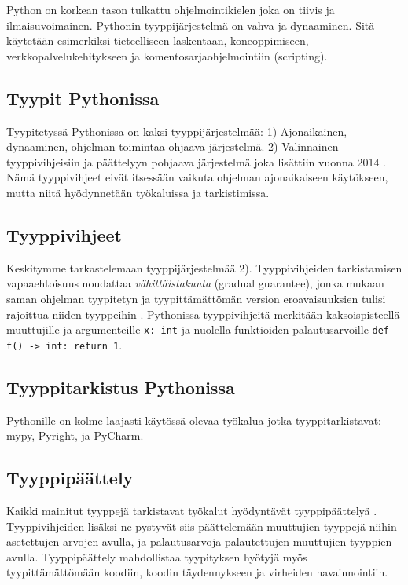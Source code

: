 \begin{otherlanguage}{finnish}
Python on korkean tason tulkattu ohjelmointikielen joka on tiivis ja ilmaisuvoimainen. Pythonin tyyppijärjestelmä on vahva ja dynaaminen. Sitä käytetään esimerkiksi tieteelliseen laskentaan, koneoppimiseen, verkkopalvelukehitykseen ja komentosarjaohjelmointiin (scripting).

\subsection*{Tyypit Pythonissa}

Tyypitetyssä Pythonissa on kaksi tyyppijärjestelmää: 1) Ajonaikainen, dynaaminen, ohjelman toimintaa ohjaava järjestelmä. 2) Valinnainen tyyppivihjeisiin ja päättelyyn pohjaava järjestelmä joka lisättiin vuonna 2014 \cite{pep_484}. Nämä tyyppivihjeet eivät itsessään vaikuta ohjelman ajonaikaiseen käytökseen, mutta niitä hyödynnetään työkaluissa ja tarkistimissa.

\subsection*{Tyyppivihjeet}

Keskitymme tarkastelemaan tyyppijärjestelmää 2). Tyyppivihjeiden tarkistamisen vapaaehtoisuus noudattaa \emph{vähittäistakuuta} (gradual guarantee), jonka mukaan saman ohjelman tyypitetyn ja tyypittämättömän version eroavaisuuksien tulisi rajoittua niiden tyyppeihin \cite{siek_refined_gradual_2015}. Pythonissa tyyppivihjeitä merkitään kaksoispisteellä muuttujille ja argumenteille {\tt x: int} ja nuolella funktioiden palautusarvoille {\tt def f() -> int: return 1}.
\subsection*{Tyyppitarkistus Pythonissa}
Pythonille on kolme laajasti käytössä olevaa työkalua jotka tyyppitarkistavat: mypy, Pyright, ja PyCharm.

\subsection*{Tyyppipäättely}

Kaikki mainitut tyyppejä tarkistavat työkalut hyödyntävät tyyppipäättelyä \cite{jetbrains_type_hinting_pycharm, mypy_type_inference, pyright_type_inference}. Tyyppivihjeiden lisäksi ne pystyvät siis päättelemään muuttujien tyyppejä niihin asetettujen arvojen avulla, ja palautusarvoja palautettujen muuttujien tyyppien avulla. Tyyppipäättely mahdollistaa tyypityksen hyötyjä myös tyypittämättömään koodiin, koodin täydennykseen ja virheiden havainnointiin.


\end{otherlanguage}
